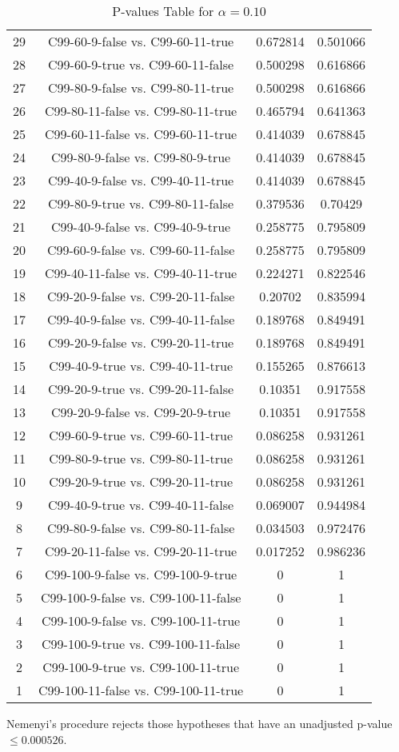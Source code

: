 \documentclass[a4paper,10pt]{article}
\begin{document}
\begin{landscape}
\begin{table}[!htp]
\begin{tabular}{cccc}
29&C99-60-9-false vs. C99-60-11-true&0.672814&0.501066\\
28&C99-60-9-true vs. C99-60-11-false&0.500298&0.616866\\
27&C99-80-9-false vs. C99-80-11-true&0.500298&0.616866\\
26&C99-80-11-false vs. C99-80-11-true&0.465794&0.641363\\
25&C99-60-11-false vs. C99-60-11-true&0.414039&0.678845\\
24&C99-80-9-false vs. C99-80-9-true&0.414039&0.678845\\
23&C99-40-9-false vs. C99-40-11-true&0.414039&0.678845\\
22&C99-80-9-true vs. C99-80-11-false&0.379536&0.70429\\
21&C99-40-9-false vs. C99-40-9-true&0.258775&0.795809\\
20&C99-60-9-false vs. C99-60-11-false&0.258775&0.795809\\
19&C99-40-11-false vs. C99-40-11-true&0.224271&0.822546\\
18&C99-20-9-false vs. C99-20-11-false&0.20702&0.835994\\
17&C99-40-9-false vs. C99-40-11-false&0.189768&0.849491\\
16&C99-20-9-false vs. C99-20-11-true&0.189768&0.849491\\
15&C99-40-9-true vs. C99-40-11-true&0.155265&0.876613\\
14&C99-20-9-true vs. C99-20-11-false&0.10351&0.917558\\
13&C99-20-9-false vs. C99-20-9-true&0.10351&0.917558\\
12&C99-60-9-true vs. C99-60-11-true&0.086258&0.931261\\
11&C99-80-9-true vs. C99-80-11-true&0.086258&0.931261\\
10&C99-20-9-true vs. C99-20-11-true&0.086258&0.931261\\
9&C99-40-9-true vs. C99-40-11-false&0.069007&0.944984\\
8&C99-80-9-false vs. C99-80-11-false&0.034503&0.972476\\
7&C99-20-11-false vs. C99-20-11-true&0.017252&0.986236\\
6&C99-100-9-false vs. C99-100-9-true&0&1\\
5&C99-100-9-false vs. C99-100-11-false&0&1\\
4&C99-100-9-false vs. C99-100-11-true&0&1\\
3&C99-100-9-true vs. C99-100-11-false&0&1\\
2&C99-100-9-true vs. C99-100-11-true&0&1\\
1&C99-100-11-false vs. C99-100-11-true&0&1\\
\hline
\end{tabular}
\caption{P-values Table for $\alpha=0.10$}
\end{table}Nemenyi's procedure rejects those hypotheses that have an unadjusted p-value $\le0.000526$.


\end{landscape}
\end{document}

